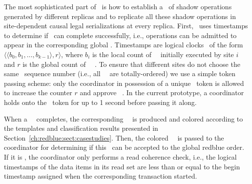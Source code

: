 The most sophisticated part of \gemini\ is how to establish a
\RBo\ of shadow operations generated by different replicas
and to replicate all these shadow operations in site-dependent
causal legal serializations at every replica. First, \Gemini\ uses timestamps to determine if 
\operations\ can complete successfully, i.e., operations can be
admitted to appear in the corresponding global \RBo. Timestamps are logical clocks~\cite{Lamport1978Time} of
the form $\langle \langle b_0, b_1, \ldots, b_{k-1}\rangle, r\rangle$,
where $b_i$ is the local count of \shadow\ \operations\ initially
executed by site $i$ and $r$ is the global count of
\red\ \shadow\ \operations.  To ensure that different sites do not
choose the same \red\ sequence number (i.e., all
  \red\ \operations\ are totally-ordered) we use a simple token
passing scheme: only the coordinator in possession of a unique
\red\ token is allowed to increase the counter $r$ and approve
\red\ \operations.  In the current prototype, a coordinator holds
onto the \red\ token for up to 1 second
before passing it along.

When a \initial\ \transaction\ completes, the corresponding
\shadow\ \operation\ is produced and colored according
to the templates and classification results presented in Section~\ref{ch:redblue:sect:casestudies}.
Then, the colored \shadow\ \operation\ is passed to the coordinator for
determining if this \operation\ can be accepted to the global redblue order. 
If it is \blue, the coordinator only performs a read coherence check, i.e.,
the logical timestamps of the data items in its read set
are less than or equal to the begin timestamp assigned when the corresponding transaction started.

